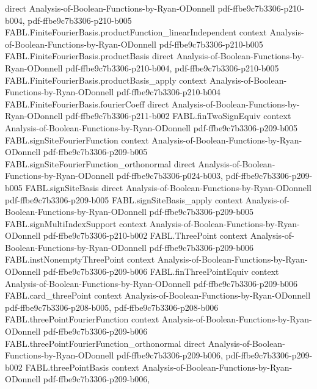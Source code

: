 \begin{theorem}
  {direct}
  {Analysis-of-Boolean-Functions-by-Ryan-ODonnell}
  {pdf-ffbe9c7b3306-p210-b004,
    pdf-ffbe9c7b3306-p210-b005}
\proofstep
  {FABL.FiniteFourierBasis.productFunction_linearIndependent}
  {context}
  {Analysis-of-Boolean-Functions-by-Ryan-ODonnell}
  {pdf-ffbe9c7b3306-p210-b005}
\proofstep
  {FABL.FiniteFourierBasis.productBasis}
  {direct}
  {Analysis-of-Boolean-Functions-by-Ryan-ODonnell}
  {pdf-ffbe9c7b3306-p210-b004,
    pdf-ffbe9c7b3306-p210-b005}
\proofstep
  {FABL.FiniteFourierBasis.productBasis_apply}
  {context}
  {Analysis-of-Boolean-Functions-by-Ryan-ODonnell}
  {pdf-ffbe9c7b3306-p210-b004}
\proofstep
  {FABL.FiniteFourierBasis.fourierCoeff}
  {direct}
  {Analysis-of-Boolean-Functions-by-Ryan-ODonnell}
  {pdf-ffbe9c7b3306-p211-b002}
\proofstep
  {FABL.finTwoSignEquiv}
  {context}
  {Analysis-of-Boolean-Functions-by-Ryan-ODonnell}
  {pdf-ffbe9c7b3306-p209-b005}
\proofstep
  {FABL.signSiteFourierFunction}
  {context}
  {Analysis-of-Boolean-Functions-by-Ryan-ODonnell}
  {pdf-ffbe9c7b3306-p209-b005}
\proofstep
  {FABL.signSiteFourierFunction_orthonormal}
  {direct}
  {Analysis-of-Boolean-Functions-by-Ryan-ODonnell}
  {pdf-ffbe9c7b3306-p024-b003,
    pdf-ffbe9c7b3306-p209-b005}
\proofstep
  {FABL.signSiteBasis}
  {direct}
  {Analysis-of-Boolean-Functions-by-Ryan-ODonnell}
  {pdf-ffbe9c7b3306-p209-b005}
\proofstep
  {FABL.signSiteBasis_apply}
  {context}
  {Analysis-of-Boolean-Functions-by-Ryan-ODonnell}
  {pdf-ffbe9c7b3306-p209-b005}
\proofstep
  {FABL.signMultiIndexSupport}
  {context}
  {Analysis-of-Boolean-Functions-by-Ryan-ODonnell}
  {pdf-ffbe9c7b3306-p210-b002}
\proofstep
  {FABL.ThreePoint}
  {context}
  {Analysis-of-Boolean-Functions-by-Ryan-ODonnell}
  {pdf-ffbe9c7b3306-p209-b006}
\proofstep
  {FABL.instNonemptyThreePoint}
  {context}
  {Analysis-of-Boolean-Functions-by-Ryan-ODonnell}
  {pdf-ffbe9c7b3306-p209-b006}
\proofstep
  {FABL.finThreePointEquiv}
  {context}
  {Analysis-of-Boolean-Functions-by-Ryan-ODonnell}
  {pdf-ffbe9c7b3306-p209-b006}
\proofstep
  {FABL.card_threePoint}
  {context}
  {Analysis-of-Boolean-Functions-by-Ryan-ODonnell}
  {pdf-ffbe9c7b3306-p208-b005,
    pdf-ffbe9c7b3306-p208-b006}
\proofstep
  {FABL.threePointFourierFunction}
  {context}
  {Analysis-of-Boolean-Functions-by-Ryan-ODonnell}
  {pdf-ffbe9c7b3306-p209-b006}
\proofstep
  {FABL.threePointFourierFunction_orthonormal}
  {direct}
  {Analysis-of-Boolean-Functions-by-Ryan-ODonnell}
  {pdf-ffbe9c7b3306-p209-b006,
    pdf-ffbe9c7b3306-p209-b002}
\proofstep
  {FABL.threePointBasis}
  {context}
  {Analysis-of-Boolean-Functions-by-Ryan-ODonnell}
  {pdf-ffbe9c7b3306-p209-b006,
}
\end{theorem}
